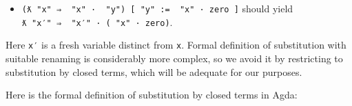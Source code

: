 \begin{itemize}
\tightlist
\item
  \texttt{(ƛ\ "x"\ ⇒\ \textasciigrave{}\ "x"\ ·\ \textasciigrave{}\ "y")\ {[}\ "y"\ :=\ \textasciigrave{}\ "x"\ ·\ \textasciigrave{}zero\ {]}}
  should yield
  \texttt{ƛ\ "x′"\ ⇒\ \textasciigrave{}\ "x′"\ ·\ (\textasciigrave{}\ "x"\ ·\ \textasciigrave{}zero)}.
\end{itemize}

Here \texttt{x′} is a fresh variable distinct from \texttt{x}. Formal
definition of substitution with suitable renaming is considerably more
complex, so we avoid it by restricting to substitution by closed terms,
which will be adequate for our purposes.

Here is the formal definition of substitution by closed terms in Agda:

